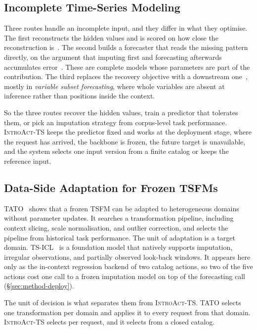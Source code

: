 \documentclass{article}
\newcommand{\introact}{\textsc{IntroAct-TS}}
\newcommand{\tsfm}{TSFM}
\begin{document}
\subsection{Incomplete Time-Series Modeling}
\label{sec:related-incomplete}
Three routes handle an incomplete input, and they differ in what they optimise. The first
reconstructs the hidden values and is scored on how close the reconstruction
is~\citep{cao2018brits,tashiro2021csdi,yoon2018gain,du2023saits,park2026t1}. The second builds
a forecaster that reads the missing pattern directly, on the argument that imputing first and
forecasting afterwards accumulates error~\citep{chen2024bitgraph,peng2025s4m,
jang2026channeltokenformer}. These are complete models whose parameters are part of the
contribution. The third replaces the recovery objective with a downstream
one~\citep{wang2024taskoriented,hao2025toivsf,hao2025gimcc,liang2025vida,xu2026srdi}, mostly in
\emph{variable subset forecasting}, where whole variables are absent at inference rather than
positions inside the context.

So the three routes recover the hidden values, train a predictor that tolerates them, or pick
an imputation strategy from corpus-level task performance. \introact{} keeps the predictor fixed
and works at the deployment stage, where the request has arrived, the backbone is frozen, the
future target is unavailable, and the system selects one input version from a finite catalog or
keeps the reference input.

\subsection{Data-Side Adaptation for Frozen \tsfm{}s}
\label{sec:related-dataside}
TATO~\citep{qiu2026tato} shows that a frozen \tsfm{} can be adapted to heterogeneous domains
without parameter updates. It searches a transformation pipeline, including context slicing,
scale normalisation, and outlier correction, and selects the pipeline from historical task
performance. The unit of adaptation is a target domain. TS-ICL~\citep{tsicl2026} is a
foundation model that natively supports imputation, irregular observations, and partially
observed look-back windows. It appears here only as the in-context regression backend of two
catalog actions, so two of the five actions cost one call to a frozen imputation model on top
of the forecasting call (\S\ref{sec:method-deploy}).

The unit of decision is what separates them from \introact{}. TATO selects one transformation
per domain and applies it to every request from that domain. \introact{} selects per request,
and it selects from a closed catalog.
\end{document}
